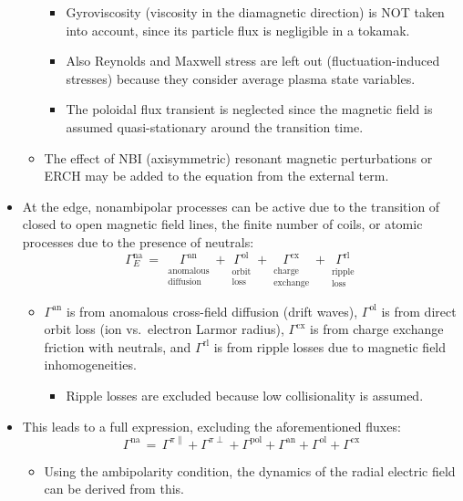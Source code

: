 \documentclass[]{article}
\providecommand{\tightlist}{%
  \setlength{\itemsep}{0pt}\setlength{\parskip}{0pt}}
\begin{document}
\begin{itemize}
\begin{itemize}
    \begin{itemize}
    \item
      {Gyroviscosity (viscosity in the diamagnetic direction)} is NOT
      taken into account, since its particle flux is negligible in a
      tokamak.
    \item
      Also Reynolds and Maxwell stress are left out (fluctuation-induced
      stresses) because they consider average plasma state variables.
    \item
      The poloidal flux transient is neglected since the magnetic field
      is assumed quasi-stationary around the transition time.
    \end{itemize}
  \item
    The effect of NBI (axisymmetric) resonant magnetic perturbations or
    ERCH may be added to the equation from the external term.
  \end{itemize}
\item
  At the edge, nonambipolar processes can be active due to the
  transition of closed to open magnetic field lines, the finite number
  of coils, or atomic processes due to the presence of neutrals:
  \[\Gamma^\text{na}_E \,=\, \underset{\substack{\text{anomalous} \\ \text{diffusion}}}{\Gamma^\text{an}} + \underset{\substack{\text{orbit} \\ \text{loss}}}{\Gamma^\text{ol}} + \underset{\substack{\text{charge} \\ \text{exchange}}}{\Gamma^\text{cx}} + \underset{\substack{\text{ripple} \\ \text{loss}}}{\Gamma^\text{rl}}\]

  \begin{itemize}
  \item
    \(\Gamma^\text{an}\) is from anomalous cross-field diffusion (drift
    waves), \(\Gamma^\text{ol}\) is from direct orbit loss (ion
    vs.~electron Larmor radius), \(\Gamma^\text{cx}\) is from charge
    exchange friction with neutrals, and \(\Gamma^\text{rl}\) is from
    ripple losses due to magnetic field inhomogeneities.

    \begin{itemize}
    \tightlist
    \item
      {Ripple losses} are excluded because low collisionality is
      assumed.
    \end{itemize}
  \end{itemize}
\item
  This leads to a full expression, excluding the aforementioned fluxes:
  \[\Gamma^\text{na} \,=\, \Gamma^{\pi \parallel} + \Gamma^{\pi \perp} + \Gamma^\text{pol} + \Gamma^\text{an} + \Gamma^\text{ol} + \Gamma^\text{cx}\]

  \begin{itemize}
  \tightlist
  \item
    Using the ambipolarity condition, the dynamics of the radial
    electric field can be derived from this.
  \end{itemize}
\end{itemize}
\end{document}
